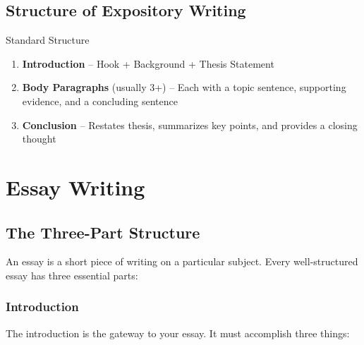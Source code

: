 \documentclass[12pt,a4paper]{article}
\begin{document}
\subsection{Structure of Expository Writing}

\begin{keybox}{Standard Structure}
\begin{enumerate}[noitemsep]
    \item \textbf{Introduction} -- Hook + Background + Thesis Statement
    \item \textbf{Body Paragraphs} (usually 3+) -- Each with a topic sentence, supporting evidence, and a concluding sentence
    \item \textbf{Conclusion} -- Restates thesis, summarizes key points, and provides a closing thought
\end{enumerate}
\end{keybox}

\newpage

\section{Essay Writing}

\subsection{The Three-Part Structure}

An essay is a short piece of writing on a particular subject. Every well-structured essay has three essential parts:

\subsubsection{Introduction}

The introduction is the gateway to your essay. It must accomplish three things:
\end{document}
